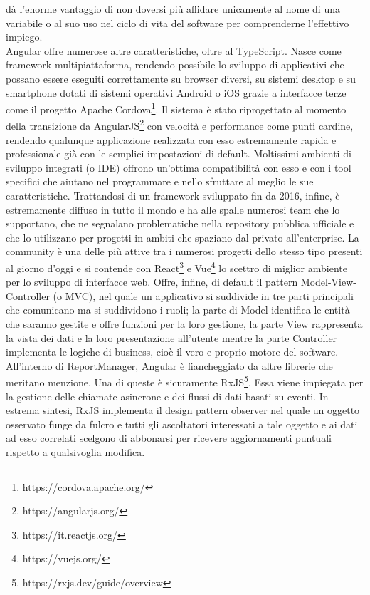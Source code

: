 dà l'enorme vantaggio di non doversi più affidare unicamente al nome di una variabile o al suo uso nel ciclo di vita del software per comprenderne l'effettivo impiego.
\\
Angular offre numerose altre caratteristiche, oltre al TypeScript.
Nasce come framework multipiattaforma, rendendo possibile lo sviluppo di applicativi che possano essere eseguiti correttamente su browser diversi, su sistemi desktop e su 
smartphone dotati di sistemi operativi Android o iOS grazie a interfacce terze come il progetto Apache Cordova\footnote{https://cordova.apache.org/}.
Il sistema è stato riprogettato al momento della transizione da AngularJS\footnote{https://angularjs.org/} con velocità e performance come punti cardine, rendendo qualunque 
applicazione realizzata con esso estremamente rapida e professionale già con le semplici impostazioni di default.
Moltissimi ambienti di sviluppo integrati (o IDE) offrono un'ottima compatibilità con esso e con i tool specifici che aiutano nel programmare e nello sfruttare al meglio le sue 
caratteristiche.
Trattandosi di un framework sviluppato fin da 2016, infine, è estremamente diffuso in tutto il mondo e ha alle spalle numerosi team che lo supportano,
che ne segnalano problematiche nella repository pubblica ufficiale e che lo utilizzano per progetti in ambiti che spaziano dal privato all'enterprise.
La community è una delle più attive tra i numerosi progetti dello stesso tipo presenti al giorno d'oggi e si contende con React\footnote{https://it.reactjs.org/} e
Vue\footnote{https://vuejs.org/} lo scettro di miglior ambiente per lo sviluppo di interfacce web.
Offre, infine, di default il pattern Model-View-Controller (o MVC), nel quale un applicativo si suddivide in tre parti principali che comunicano ma si suddividono i ruoli;
la parte di Model identifica le entità che saranno gestite e offre funzioni per la loro gestione, la parte View rappresenta la vista dei dati e la loro presentazione 
all'utente mentre la parte Controller implementa le logiche di business, cioè il vero e proprio motore del software.
\\
All'interno di ReportManager, Angular è fiancheggiato da altre librerie che meritano menzione.
Una di queste è sicuramente RxJS\footnote{https://rxjs.dev/guide/overview}. Essa viene impiegata per la gestione delle chiamate asincrone e dei flussi di dati basati su eventi.
In estrema sintesi, RxJS implementa il design pattern observer nel quale un oggetto osservato funge da fulcro e tutti gli ascoltatori interessati a tale oggetto e ai dati ad esso
correlati scelgono di abbonarsi per ricevere aggiornamenti puntuali rispetto a qualsivoglia modifica.
